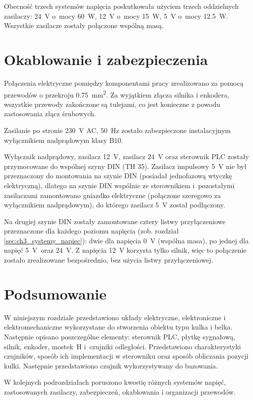 Obecność trzech systemów napięcia poskutkowała użyciem trzech oddzielnych zasilaczy: \SI{24}{\volt} o~mocy \SI{60}{\watt}, \SI{12}{\volt} o~mocy \SI{15}{\watt}, \SI{5}{\volt} o~mocy \SI{12,5}{\watt}. Wszystkie zasilacze zostały połączone wspólną masą.

\section{Okablowanie i zabezpieczenia}
\label{sec:ch3_okablowanie_zabezpieczenia}


Połączenia elektryczne pomiędzy komponentami pracy zrealizowano za pomocą przewodów o przekroju \SI{0,75}{\milli\meter\squared}. Za wyjątkiem złącza silnika i enkodera, wszystkie przewody zakończone są tulejami, co jest konieczne z powodu zastosowania złącz śrubowych.

Zasilanie po stronie \SI{230}{\volt} AC, \SI{50}{\hertz} zostało zabezpieczone instalacyjnym wyłącznikiem nadprądowym klasy B10.

Wyłącznik nadprądowy, zasilacz \SI{12}{\volt}, zasilacz \SI{24}{\volt} oraz sterownik PLC zostały przymocowane do wspólnej szyny DIN (TH \num{35}). Zasilacz impulsowy \SI{5}{\volt} nie był przeznaczony do montowania na szynie DIN (posiadał jednofazową wtyczkę elektryczną), dlatego na szynie DIN wspólnie ze sterownikiem i~pozostałymi zasilaczami zamontowano gniazdko elektryczne (połączone szeregowo za wyłącznikiem nadprądowym), do którego zasilacz \SI{5}{\volt} został podłączony.

Na drugiej szynie DIN zostały zamontowane cztery listwy przyłączeniowe przeznaczone dla każdego poziomu napięcia (zob. rozdział \ref{sec:ch3_systemy_napiec}): dwie dla napięcia \SI{0}{\volt} (wspólna masa), po jednej dla napięć \SI{5}{\volt}~oraz \SI{24}{\volt}. Z napięcia \SI{12}{\volt} korzysta tylko silnik, więc to połączenie zostało zrealizowane bezpośrednio, bez użycia listwy przyłączeniowej.


\section{Podsumowanie}

W niniejszym rozdziale przedstawiono układy elektryczne, elektroniczne i elektromechaniczne wykorzystane do stworzenia obiektu typu kulka i belka. Następnie opisano poszczególne elementy: sterownik PLC, płytkę sygnałową, silnik, enkoder, mostek~H i~czujniki odległości. Przedstawiono charakterystyki czujników, sposób ich implementacji w sterowniku oraz sposób obliczania pozycji kulki. Następnie przedstawiono czujnik wykorzystywany do bazowania.

W kolejnych podrozdziałach poruszono kwestię różnych systemów napięć, zastosowanych zasilaczy, zabezpieczeń, okablowania i organizacji przewodów.

